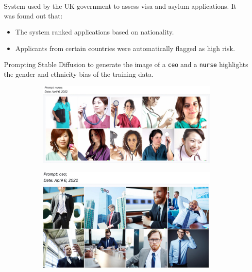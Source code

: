\begin{example}
    System used by the UK government to assess visa and asylum applications. It was found out that:
    \begin{itemize}
        \item The system ranked applications based on nationality.
        \item Applicants from certain countries were automatically flagged as high risk.
    \end{itemize}
\end{example}

\begin{example}[Generative AI]
    Prompting Stable Diffusion to generate the image of a \texttt{ceo} and a \texttt{nurse} highlights the gender and ethnicity bias of the training data.

    \begin{figure}[H]
        \centering
        \begin{subfigure}{0.5\linewidth}
            \centering
            \includegraphics[width=\linewidth]{./img/stable_diffusion_nurse.png}
        \end{subfigure}
        \hfill
        \begin{subfigure}{0.4\linewidth}
            \centering
            \includegraphics[width=\linewidth]{./img/stable_diffusion_ceo.png}
        \end{subfigure}
    \end{figure}


\end{example}
